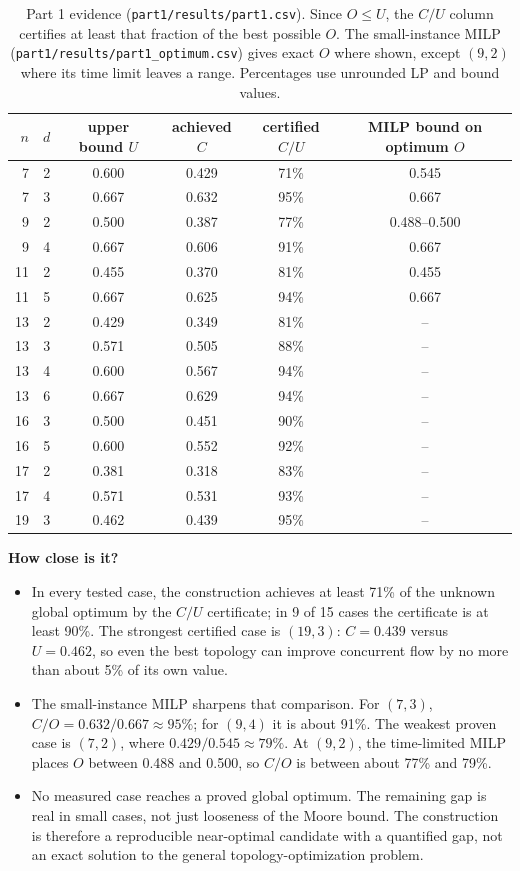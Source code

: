 \documentclass[11pt,letterpaper]{article}
\begin{document}
\begin{table}[H]
\centering\footnotesize\setlength{\tabcolsep}{5pt}
\begin{tabular}{rrcccc}
\toprule
$n$ & $d$ & upper bound $U$ & achieved $C$ & certified $C/U$ & MILP bound on optimum $O$ \\
\midrule
 7 & 2 & 0.600 & 0.429 & 71\% & 0.545 \\
 7 & 3 & 0.667 & 0.632 & 95\% & 0.667 \\
 9 & 2 & 0.500 & 0.387 & 77\% & 0.488--0.500 \\
 9 & 4 & 0.667 & 0.606 & 91\% & 0.667 \\
11 & 2 & 0.455 & 0.370 & 81\% & 0.455 \\
11 & 5 & 0.667 & 0.625 & 94\% & 0.667 \\
13 & 2 & 0.429 & 0.349 & 81\% & -- \\
13 & 3 & 0.571 & 0.505 & 88\% & -- \\
13 & 4 & 0.600 & 0.567 & 94\% & -- \\
13 & 6 & 0.667 & 0.629 & 94\% & -- \\
16 & 3 & 0.500 & 0.451 & 90\% & -- \\
16 & 5 & 0.600 & 0.552 & 92\% & -- \\
17 & 2 & 0.381 & 0.318 & 83\% & -- \\
17 & 4 & 0.571 & 0.531 & 93\% & -- \\
19 & 3 & 0.462 & 0.439 & 95\% & -- \\
\bottomrule
\end{tabular}
\caption{Part 1 evidence (\texttt{part1/results/part1.csv}). Since $O\le U$,
the $C/U$ column certifies at least that fraction of the best possible $O$.
The small-instance MILP (\texttt{part1/results/part1\_optimum.csv}) gives
exact $O$ where shown, except $(9,2)$ where its time limit leaves a range.
Percentages use unrounded LP and bound values.}
\label{tab:p1}
\end{table}

\textbf{How close is it?}
\begin{itemize}
\item In every tested case, the construction achieves at least 71\% of the
unknown global optimum by the $C/U$ certificate; in 9 of 15 cases the
certificate is at least 90\%. The strongest certified case is $(19,3)$:
$C=0.439$ versus $U=0.462$, so even the best topology can improve concurrent
flow by no more than about 5\% of its own value.
\item The small-instance MILP sharpens that comparison. For $(7,3)$,
$C/O=0.632/0.667\approx95\%$; for $(9,4)$ it is about 91\%. The weakest
proven case is $(7,2)$, where $0.429/0.545\approx79\%$. At $(9,2)$, the
time-limited MILP places $O$ between 0.488 and 0.500, so $C/O$ is between
about 77\% and 79\%.
\item No measured case reaches a proved global optimum. The remaining gap
is real in small cases, not just looseness of the Moore bound. The construction
is therefore a reproducible near-optimal candidate with a quantified gap,
not an exact solution to the general topology-optimization problem.
\end{itemize}
\end{document}
